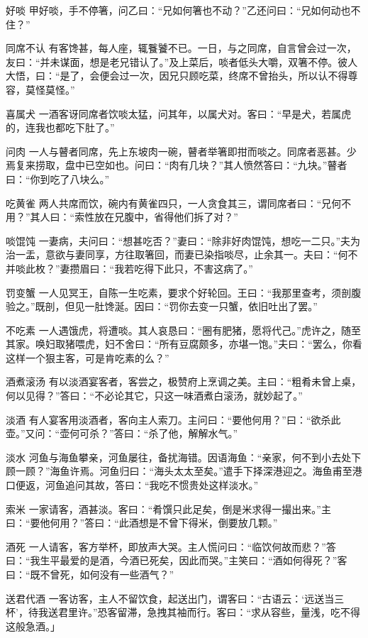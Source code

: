 \documentclass[12pt,UTF8]{ctexbook}
\begin{document}
好啖
甲好啖，手不停箸，问乙曰：“兄如何箸也不动？”乙还问曰：“兄如何动也不住？”

同席不认
有客馋甚，每人座，辄餮饕不已。一日，与之同席，自言曾会过一次，友曰：“并未谋面，想是老兄错认了。”及上菜后，啖者低头大嚼，双箸不停。彼人大悟，曰：“是了，会便会过一次，因兄只顾吃菜，终席不曾抬头，所以认不得尊容，莫怪莫怪。”

喜属犬
一酒客讶同席者饮啖太猛，问其年，以属犬对。客曰：“早是犬，若属虎的，连我也都吃下肚了。”

问肉
一人与瞽者同席，先上东坡肉一碗，瞽者举箸即拑而啖之。同席者恶甚。少焉复来捞取，盘中已空如也。问曰：“肉有几块？”其人愤然答曰：“九块。”瞽者曰：“你到吃了八块么。”

吃黄雀
两人共席而饮，碗内有黄雀四只，一人贪食其三，谓同席者曰：“兄何不用？”其人曰：“索性放在兄腹中，省得他们拆了对？”

啖馄饨
一妻病，夫问曰：“想甚吃否？”妻曰：“除非好肉馄饨，想吃一二只。”夫为治一盂，意欲与妻同享，方往取箸回，而妻已染指啖尽，止余其一。夫曰：“何不并啖此枚？”妻攒眉曰：“我若吃得下此只，不害这病了。”

罚变蟹
一人见冥王，自陈一生吃素，要求个好轮回。王曰：“我那里查考，须剖腹验之。”既剖，但见一肚馋涎。因曰：“罚你去变一只蟹，依旧吐出了罢。”

不吃素
一人遇饿虎，将遭啖。其人哀恳曰：“圈有肥猪，愿将代己。”虎许之，随至其家。唤妇取猪喂虎，妇不舍曰：“所有豆腐颇多，亦堪一饱。”夫曰：“罢么，你看这样一个狠主客，可是肯吃素的么？”

酒煮滚汤
有以淡酒宴客者，客尝之，极赞府上烹调之美。主曰：“粗肴未曾上桌，何以见得？”答曰：“不必论其它，只这一味酒煮白滚汤，就妙起了。”

淡酒
有人宴客用淡酒者，客向主人索刀。主问曰：“要他何用？”曰：“欲杀此壶。”又问：“壶何可杀？”答曰：“杀了他，解解水气。”

淡水
河鱼与海鱼攀亲，河鱼屡往，备扰海错。因语海鱼：“亲家，何不到小去处下顾一顾？”海鱼许焉。河鱼归曰：“海头太太至矣。”遣手下择深港迎之。海鱼甫至港口便返，河鱼追问其故，答曰：“我吃不惯贵处这样淡水。”

索米
一家请客，酒甚淡。客曰：“肴馔只此足矣，倒是米求得一撮出来。”主曰：“要他何用？”答曰：“此酒想是不曾下得米，倒要放几颗。”

酒死
一人请客，客方举杯，即放声大哭。主人慌问曰：“临饮何故而悲？”答曰：“我生平最爱的是酒，今酒已死矣，因此而哭。”主笑曰：“酒如何得死？”客曰：“既不曾死，如何没有一些酒气？”

送君代酒
一客访客，主人不留饮食，起送出门，谓客曰：“古语云：‘远送当三杯’，待我送君里许。”恐客留滞，急拽其袖而行。客曰：“求从容些，量浅，吃不得这般急酒。」
\end{document}
